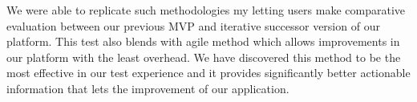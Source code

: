 We were able to replicate such methodologies my letting users make comparative evaluation between our previous MVP and iterative successor version of our platform. This test also blends with agile method which allows improvements in our platform with the least overhead. We have discovered this method to be the most effective in our test experience and it provides significantly better actionable information that lets the improvement of our application.

\clearpage